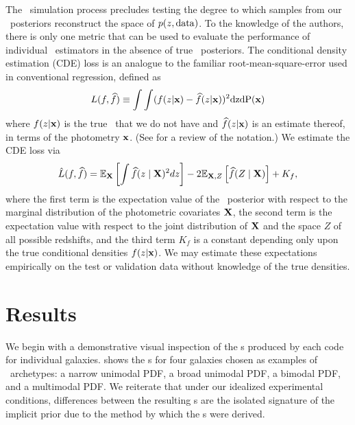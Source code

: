 The \buzz\ simulation process precludes testing the degree to which samples from our \pz\ posteriors reconstruct the space of $p(z, {\rm data})$.
To the knowledge of the authors, there is only one metric that can be used to evaluate the performance of individual \pzpdf\ estimators in the absence of true \pz\ posteriors.
The conditional density estimation (CDE) loss is an analogue to the familiar root-mean-square-error used in conventional regression, defined as
\begin{equation}
\eqlabel{eq:cde-loss}
L(f, \widehat{f}) \equiv \int \int (f(z \vert \x) - \widehat{f}(z \vert \x))^{2} \rm{d}z \rm{d}P(\x)
\end{equation}
where $f(z \vert {\mathbf{x}})$ is the true \pzpdf\ that we do not have and $\widehat{f}(z \vert {\mathbf{x}})$ is an estimate thereof, in terms of the photometry ${\mathbf{x}}$.
(See  for a review of the notation.)
We estimate the CDE loss via
\begin{equation}
\eqlabel{eq:estimated-cde-loss}
\hat{L}(f, \widehat{f}) = \mathbb{E}_\X \left[\int \widehat{f}(z \mid \X)^{2} dz\right] - 2 \mathbb{E}_{\X, Z}\left[\widehat{f}(Z \mid \X)\right] + K_{f},
\end{equation}
where the first term is the expectation value of the \pz\ posterior with respect to the marginal distribution of the photometric covariates ${\mathbf{X}}$, the second term is the expectation value with respect to the joint distribution of ${\mathbf{X}}$ and the space $Z$ of all possible redshifts, and the third term $K_{f}$ is a constant depending only upon the true conditional densities $f(z \vert {\mathbf{x}})$.
We may estimate these expectations empirically on the test or validation data \citep[Eq.~7 in][]{izbicki_photo-z_2017} without knowledge of the true densities.

\section{Results}

We begin with a demonstrative visual inspection of the \pzpdf s produced by each code for individual galaxies.
 shows the \pzpdf s for four galaxies chosen as examples of \pzpdf\ archetypes: a narrow unimodal PDF, a broad unimodal PDF, a bimodal PDF, and a multimodal PDF.
We reiterate that under our idealized experimental conditions, differences between the resulting \pzpdf s are the isolated signature of the implicit prior due to the method by which the \pzpdf s were derived.

